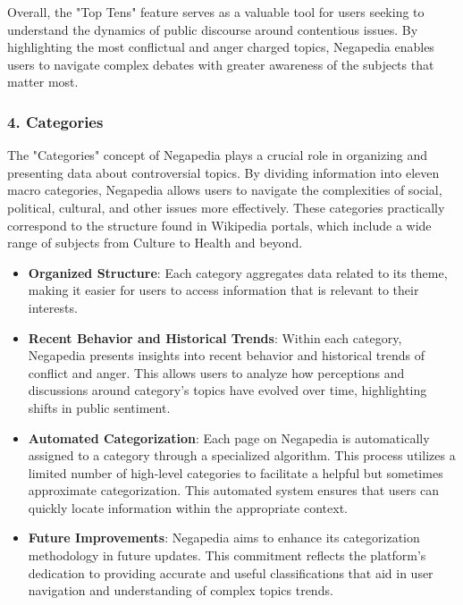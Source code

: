 Overall, the "Top Tens" feature serves as a valuable tool for users seeking to understand the dynamics of public discourse around contentious issues. By highlighting the most conflictual and anger charged topics, Negapedia enables users to navigate complex debates with greater awareness of the subjects that matter most.

\subsubsection{4. Categories}

The "Categories" concept of Negapedia plays a crucial role in organizing and presenting data about controversial topics. By dividing information into eleven macro categories, Negapedia allows users to navigate the complexities of social, political, cultural, and other issues more effectively. These categories practically correspond to the structure found in Wikipedia portals, which include a wide range of subjects from Culture to Health and beyond.

\begin{itemize}
    \item \textbf{Organized Structure}: Each category aggregates data related to its theme, making it easier for users to access information that is relevant to their interests.
    
    \item \textbf{Recent Behavior and Historical Trends}: Within each category, Negapedia presents insights into recent behavior and historical trends of conflict and anger. This allows users to analyze how perceptions and discussions around category's topics have evolved over time, highlighting shifts in public sentiment.

    \item \textbf{Automated Categorization}: Each page on Negapedia is automatically assigned to a category through a specialized algorithm. This process utilizes a limited number of high-level categories to facilitate a helpful but sometimes approximate categorization. This automated system ensures that users can quickly locate information within the appropriate context.
    
    \item \textbf{Future Improvements}: Negapedia aims to enhance its categorization methodology in future updates. This commitment reflects the platform's dedication to providing accurate and useful classifications that aid in user navigation and understanding of complex topics trends.
\end{itemize}

